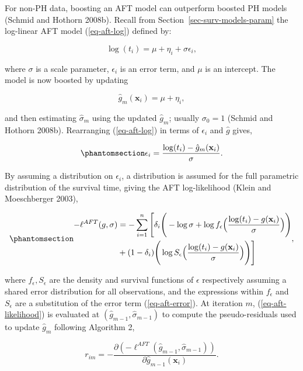 \documentclass[
  letterpaper,
  krantz2]{style/krantz}
\begin{document}
For non-PH data, boosting an AFT model can outperform boosted PH models
(Schmid and Hothorn 2008b). Recall from
Section~\ref{sec-surv-models-param} the log-linear AFT model
(\ref{eq-aft-log}) defined
by:

\[
\log(t_i) = \mu + \eta_i + \sigma\epsilon_i,
\]

where \(\sigma\) is a scale parameter, \(\epsilon_i\) is an error term,
and \(\mu\) is an intercept. The model is now boosted by updating

\[
\hat{g}_m(\mathbf{x}_i) = \mu + \eta_i,
\]

and then estimating \(\hat{\sigma}_m\) using the updated \(\hat{g}_m\);
usually \(\sigma_0 = 1\) (Schmid and Hothorn 2008b). Rearranging
(\ref{eq-aft-log}) in terms of \(\epsilon_i\) and \(\hat{g}\) gives,

\begin{equation}\phantomsection\label{eq-aft-error}{
\epsilon_i = \frac{\log(t_i) - \hat{g}_m(\mathbf{x}_i)}{\sigma}.
}\end{equation}

By assuming a distribution on \(\epsilon_i\), a distribution is assumed
for the full parametric distribution of the survival time, giving the
AFT log-likelihood (Klein and Moeschberger 2003),

\begin{equation}\phantomsection\label{eq-aft-likelihood}{
\begin{aligned}
-\ell^{AFT}(g, \sigma)
& = -\sum^n_{i=1} \Bigg[ \delta_i\Bigg(- \log{\sigma} + \log f_{\epsilon}\Big(\frac{\log(t_i) - g(\mathbf{x}_i)}{\sigma}\Big)\Bigg) \\
& + (1-\delta_i)\Bigg(\log S_{\epsilon}\Big(\frac{\log(t_i) - g(\mathbf{x}_i)}{\sigma}\Big)\Bigg) \Bigg]
\end{aligned},
}\end{equation}

where \(f_{\epsilon}, S_{\epsilon}\) are the density and survival
functions of \(\epsilon\) respectively assuming a shared error
distribution for all observations, and the expressions within
\(f_{\epsilon}\) and \(S_{\epsilon}\) are a substitution of the error
term (\ref{eq-aft-error}). At iteration \(m\), (\ref{eq-aft-likelihood})
is evaluated at \((\hat{g}_{m-1}, \hat{\sigma}_{m-1})\) to compute the
pseudo-residuals used to update \(\hat{g}_m\) following Algorithm 2,

\[
r_{im} = -\frac{\partial(-\ell^{AFT}(\hat{g}_{m-1}, \hat{\sigma}_{m-1}))}{\partial \hat{g}_{m-1}(\mathbf{x}_i)}.
\]
\end{document}
